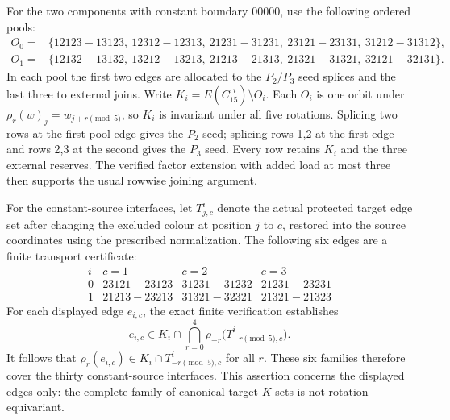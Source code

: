 
For the two components with constant boundary $00000$, use the following
ordered pools:
\[
\begin{split}
O_0={}&\{12123\!-13123,\ 12312\!-12313,\ 21231\!-31231,
          \ 23121\!-23131,\ 31212\!-31312\},\\
O_1={}&\{12132\!-13132,\ 13212\!-13213,\ 21213\!-21313,
          \ 21321\!-31321,\ 32121\!-32131\}.
\end{split}
\]
In each pool the first two edges are allocated to the $P_2/P_3$ seed splices
and the last three to external joins. Write $K_i=E(C_{15}^{,i})\setminus O_i$.
Each $O_i$ is one orbit under
$\rho_r(w)_j=w_{j+r\pmod5}$, so $K_i$ is invariant under all five rotations.
Splicing two rows at the first pool edge gives the $P_2$ seed; splicing rows
1,2 at the first edge and rows 2,3 at the second gives the $P_3$ seed. Every
row retains $K_i$ and the three external reserves. The verified factor
extension with added load at most three then supports the usual rowwise
joining argument.

For the constant-source interfaces, let $T^i_{j,c}$ denote the actual
protected target edge set after changing the excluded colour at position
$j$ to $c$, restored into the source coordinates using the prescribed
normalization. The following six edges are a finite transport certificate:
\[
\begin{array}{c|ccc}
i & c=1 & c=2 & c=3\\ \hline
0 & 23121\!-23123 & 31231\!-31232 & 21231\!-23231\\
1 & 21213\!-23213 & 31321\!-32321 & 21321\!-21323
\end{array}
\]
For each displayed edge $e_{i,c}$, the exact finite verification establishes
\[
 e_{i,c}\in K_i\cap\bigcap_{r=0}^{4}
             \rho_{-r}\bigl(T^i_{-r\pmod5,c}\bigr).
\]
It follows that $\rho_r(e_{i,c})\in K_i\cap T^i_{-r\pmod5,c}$ for all $r$.
These six families therefore cover the thirty constant-source interfaces.
This assertion concerns the displayed edges only: the complete family of
canonical target $K$ sets is not rotation-equivariant.

